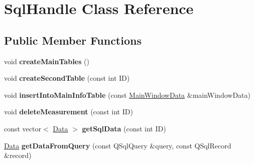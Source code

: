 \hypertarget{classSqlHandle}{\section{Sql\-Handle Class Reference}
\label{classSqlHandle}
}
\subsection*{Public Member Functions}
\begin{DoxyCompactItemize}
\item 
\hypertarget{classSqlHandle_a74881baa2b268e2507d361007ca3d071}{void {\bfseries create\-Main\-Tables} ()}\label{classSqlHandle_a74881baa2b268e2507d361007ca3d071}

\item 
\hypertarget{classSqlHandle_a09cc807b1fb5aeda615ba8081f66cc1f}{void {\bfseries create\-Second\-Table} (const int I\-D)}\label{classSqlHandle_a09cc807b1fb5aeda615ba8081f66cc1f}

\item 
\hypertarget{classSqlHandle_a7a0d2c81551b031837bbea9cf97b513e}{void {\bfseries insert\-Into\-Main\-Info\-Table} (const \hyperlink{structMainWindowData}{Main\-Window\-Data} \&main\-Window\-Data)}\label{classSqlHandle_a7a0d2c81551b031837bbea9cf97b513e}

\item 
\hypertarget{classSqlHandle_ac111d82dcd20a975ab64563313403c5f}{void {\bfseries delete\-Measurement} (const int I\-D)}\label{classSqlHandle_ac111d82dcd20a975ab64563313403c5f}

\item 
\hypertarget{classSqlHandle_a8cbd20e9edad986197ceec01897442e7}{const vector$<$ \hyperlink{classData}{Data} $>$ {\bfseries get\-Sql\-Data} (const int I\-D)}\label{classSqlHandle_a8cbd20e9edad986197ceec01897442e7}

\item 
\hypertarget{classSqlHandle_a9e63022701c72474a6baf13f581fbc02}{\hyperlink{classData}{Data} {\bfseries get\-Data\-From\-Query} (const Q\-Sql\-Query \&query, const Q\-Sql\-Record \&record)}\label{classSqlHandle_a9e63022701c72474a6baf13f581fbc02}

\end{DoxyCompactItemize}
